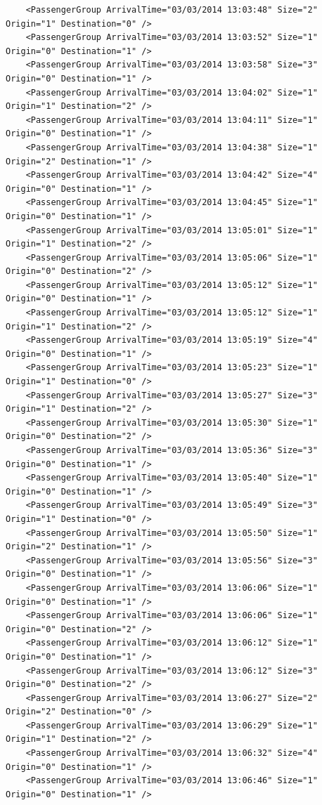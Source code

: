 \documentclass{UoYCSproject}
\begin{document}
\begin{appendices}
\begin{lstlisting}
	<PassengerGroup ArrivalTime="03/03/2014 13:03:48" Size="2" Origin="1" Destination="0" />
	<PassengerGroup ArrivalTime="03/03/2014 13:03:52" Size="1" Origin="0" Destination="1" />
	<PassengerGroup ArrivalTime="03/03/2014 13:03:58" Size="3" Origin="0" Destination="1" />
	<PassengerGroup ArrivalTime="03/03/2014 13:04:02" Size="1" Origin="1" Destination="2" />
	<PassengerGroup ArrivalTime="03/03/2014 13:04:11" Size="1" Origin="0" Destination="1" />
	<PassengerGroup ArrivalTime="03/03/2014 13:04:38" Size="1" Origin="2" Destination="1" />
	<PassengerGroup ArrivalTime="03/03/2014 13:04:42" Size="4" Origin="0" Destination="1" />
	<PassengerGroup ArrivalTime="03/03/2014 13:04:45" Size="1" Origin="0" Destination="1" />
	<PassengerGroup ArrivalTime="03/03/2014 13:05:01" Size="1" Origin="1" Destination="2" />
	<PassengerGroup ArrivalTime="03/03/2014 13:05:06" Size="1" Origin="0" Destination="2" />
	<PassengerGroup ArrivalTime="03/03/2014 13:05:12" Size="1" Origin="0" Destination="1" />
	<PassengerGroup ArrivalTime="03/03/2014 13:05:12" Size="1" Origin="1" Destination="2" />
	<PassengerGroup ArrivalTime="03/03/2014 13:05:19" Size="4" Origin="0" Destination="1" />
	<PassengerGroup ArrivalTime="03/03/2014 13:05:23" Size="1" Origin="1" Destination="0" />
	<PassengerGroup ArrivalTime="03/03/2014 13:05:27" Size="3" Origin="1" Destination="2" />
	<PassengerGroup ArrivalTime="03/03/2014 13:05:30" Size="1" Origin="0" Destination="2" />
	<PassengerGroup ArrivalTime="03/03/2014 13:05:36" Size="3" Origin="0" Destination="1" />
	<PassengerGroup ArrivalTime="03/03/2014 13:05:40" Size="1" Origin="0" Destination="1" />
	<PassengerGroup ArrivalTime="03/03/2014 13:05:49" Size="3" Origin="1" Destination="0" />
	<PassengerGroup ArrivalTime="03/03/2014 13:05:50" Size="1" Origin="2" Destination="1" />
	<PassengerGroup ArrivalTime="03/03/2014 13:05:56" Size="3" Origin="0" Destination="1" />
	<PassengerGroup ArrivalTime="03/03/2014 13:06:06" Size="1" Origin="0" Destination="1" />
	<PassengerGroup ArrivalTime="03/03/2014 13:06:06" Size="1" Origin="0" Destination="2" />
	<PassengerGroup ArrivalTime="03/03/2014 13:06:12" Size="1" Origin="0" Destination="1" />
	<PassengerGroup ArrivalTime="03/03/2014 13:06:12" Size="3" Origin="0" Destination="2" />
	<PassengerGroup ArrivalTime="03/03/2014 13:06:27" Size="2" Origin="2" Destination="0" />
	<PassengerGroup ArrivalTime="03/03/2014 13:06:29" Size="1" Origin="1" Destination="2" />
	<PassengerGroup ArrivalTime="03/03/2014 13:06:32" Size="4" Origin="0" Destination="1" />
	<PassengerGroup ArrivalTime="03/03/2014 13:06:46" Size="1" Origin="0" Destination="1" />

\end{lstlisting}
\end{appendices}
\end{document}
